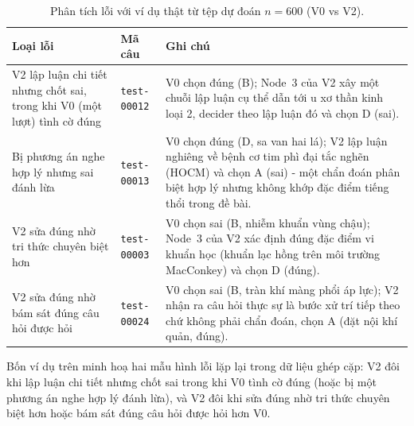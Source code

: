 \documentclass[11pt]{article}
\begin{document}
\begin{table}[h]
  \centering
  \caption{Phân tích lỗi với ví dụ thật từ tệp dự đoán $n{=}600$ (V0 vs V2).}
  \label{tab:error}
  \small
  \begin{tabular}{@{}p{}p{}p{}@{}}
    \toprule
    Loại lỗi & Mã câu & Ghi chú \\
    \midrule
    V2 lập luận chi tiết nhưng chốt sai, trong khi V0 (một lượt) tình cờ đúng &
    \texttt{test-00012} &
    V0 chọn đúng (B); Node~3 của V2 xây một chuỗi lập luận cụ thể dẫn tới u xơ thần kinh loại 2, decider
    theo lập luận đó và chọn D (sai). \\
    Bị phương án nghe hợp lý nhưng sai đánh lừa &
    \texttt{test-00013} &
    V0 chọn đúng (D, sa van hai lá); V2 lập luận nghiêng về bệnh cơ tim phì đại tắc nghẽn (HOCM) và
    chọn A (sai) - một chẩn đoán phân biệt hợp lý nhưng không khớp đặc điểm tiếng thổi trong đề bài. \\
    V2 sửa đúng nhờ tri thức chuyên biệt hơn &
    \texttt{test-00003} &
    V0 chọn sai (B, nhiễm khuẩn vùng chậu); Node~3 của V2 xác định đúng đặc điểm vi khuẩn học (khuẩn lạc
    hồng trên môi trường MacConkey) và chọn D (đúng). \\
    V2 sửa đúng nhờ bám sát đúng câu hỏi được hỏi &
    \texttt{test-00024} &
    V0 chọn sai (B, tràn khí màng phổi áp lực); V2 nhận ra câu hỏi thực sự là bước xử trí tiếp theo chứ
    không phải chẩn đoán, chọn A (đặt nội khí quản, đúng). \\
    \bottomrule
  \end{tabular}
\end{table}
Bốn ví dụ trên minh hoạ hai mẫu hình lỗi lặp lại trong dữ liệu ghép cặp: V2 đôi khi lập luận chi tiết
nhưng chốt sai trong khi V0 tình cờ đúng (hoặc bị một phương án nghe hợp lý đánh lừa), và V2 đôi khi sửa
đúng nhờ tri thức chuyên biệt hơn hoặc bám sát đúng câu hỏi được hỏi hơn V0.

\FloatBarrier
\end{document}
